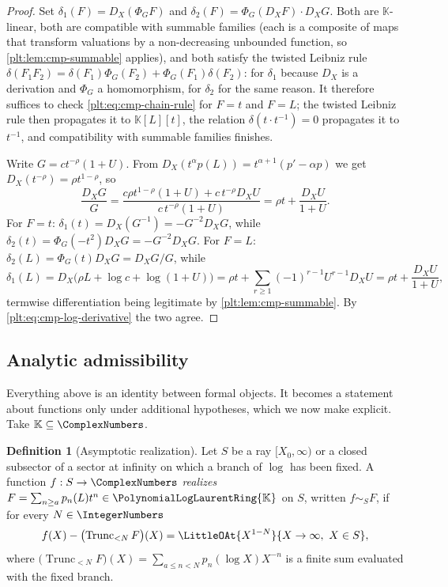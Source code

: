\documentclass[11pt,oneside]{article}
\theoremstyle{plain}
\theoremstyle{definition}
\newtheorem{definition}[theorem]{Definition}
\theoremstyle{remark}
\newcommand{\K}{\mathbb{K}}
\newcommand{\PLlau}{\PolynomialLogLaurentRing{\K}}       %
\newcommand{\Trunc}[2]{\operatorname{Trunc}_{<#2}#1}     %
\newcommand{\DX}{D_{X}}                                  %
\begin{document}
\begin{proof}
Set \(\delta_1(F)=\DX(\Phi_{G}F)\) and
\(\delta_2(F)=\Phi_{G}(\DX F)\cdot\DX G\).  Both are \(\K\)-linear, both are
compatible with summable families (each is a composite of maps that transform
valuations by a non-decreasing unbounded function, so
\cref{plt:lem:cmp-summable} applies), and both satisfy the twisted Leibniz
rule
\(\delta(F_1F_2)=\delta(F_1)\Phi_{G}(F_2)+\Phi_{G}(F_1)\delta(F_2)\): for
\(\delta_1\) because \(\DX\) is a derivation and \(\Phi_G\) a homomorphism,
for \(\delta_2\) for the same reason.  It therefore suffices to check
\eqref{plt:eq:cmp-chain-rule} for \(F=t\) and \(F=L\); the twisted Leibniz
rule then propagates it to \(\K[L][t]\), the relation
\(\delta(t\cdot t^{-1})=0\) propagates it to \(t^{-1}\), and compatibility
with summable families finishes.

Write \(G=ct^{-\rho}(1+U)\).  From
\(\DX(t^{\alpha}p(L))=t^{\alpha+1}(p'-\alpha p)\) we get
\(\DX(t^{-\rho})=\rho t^{1-\rho}\), so
\begin{equation}\label{plt:eq:cmp-log-derivative}
 \frac{\DX G}{G}
 =\frac{c\rho t^{1-\rho}(1+U)+c\,t^{-\rho}\DX U}{c\,t^{-\rho}(1+U)}
 =\rho t+\frac{\DX U}{1+U}.
\end{equation}
For \(F=t\): \(\delta_1(t)=\DX(G^{-1})=-G^{-2}\DX G\), while
\(\delta_2(t)=\Phi_{G}(-t^{2})\DX G=-G^{-2}\DX G\).  For \(F=L\):
\(\delta_2(L)=\Phi_{G}(t)\DX G=\DX G/G\), while
\[
 \delta_1(L)=\DX\bigl(\rho L+\log c+\log(1+U)\bigr)
 =\rho t+\sum_{r\ge1}(-1)^{r-1}U^{r-1}\DX U
 =\rho t+\frac{\DX U}{1+U},
\]
termwise differentiation being legitimate by
\cref{plt:lem:cmp-summable}.  By \eqref{plt:eq:cmp-log-derivative} the two
agree.
\end{proof}

\subsection{Analytic admissibility}
\label{plt:sec:cmp-analytic}

Everything above is an identity between formal objects.  It becomes a
statement about functions only under additional hypotheses, which we now make
explicit.  Take \(\K\subseteq\ComplexNumbers\).

\begin{definition}[Asymptotic realization]\label{plt:def:cmp-realization}
Let \(S\) be a ray \([X_{0},\infty)\) or a closed subsector of a sector at
infinity on which a branch of \(\log\) has been fixed.  A function
\(f:S\to\ComplexNumbers\) \emph{realizes} \(F=\sum_{n\ge a}p_n(L)t^n\in\PLlau\)
on \(S\), written \(f\sim_{S}F\), if for every \(N\in\IntegerNumbers\)
\begin{equation}\label{plt:eq:cmp-realization}
 f(X)-\bigl(\Trunc{F}{N}\bigr)(X)
 =\LittleOAt{X^{1-N}}{X\to\infty,\ X\in S},
\end{equation}
where \(\bigl(\Trunc{F}{N}\bigr)(X)=\sum_{a\le n<N}p_n(\log X)X^{-n}\) is a
finite sum evaluated with the fixed branch.
\end{definition}
\end{document}
